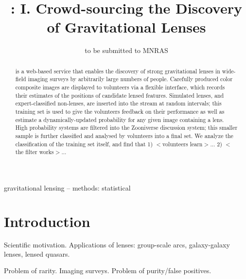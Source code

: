\documentclass[useAMS,usenatbib,a4paper]{mn2e}
\title[\sw I]
{\SW: I. Crowd-sourcing the Discovery of Gravitational Lenses}
\author[Marshall et al.]{%
  
}
\begin{document}
             
\date{to be submitted to MNRAS}
\pagerange{\pageref{firstpage}--\pageref{lastpage}}

\maketitle           

\label{firstpage}


\begin{abstract} 

\sw is a web-based service
 that enables the discovery of strong
gravitational lenses in wide-field imaging surveys by arbitrarily large
numbers of people. Carefully produced color composite images are
displayed to volunteers via a flexible interface, which records
their estimates of the positions of candidate lensed features. Simulated
lenses, and expert-classified non-lenses, are inserted into the stream
at random intervals; this training set is used to give the volunteers
feedback on their performance as well as estimate a dynamically-updated
probability for any given image containing a lens. High probability
systems are filtered into the Zooniverse \Talk discussion system; this
smaller sample is further classified and analysed by volunteers into a
final set. We analyze the classification of the training set itself, and
find that 1) $<$volunteers learn$>$... 2) $<$the filter works$>$... 

\end{abstract}


\begin{keywords}
  gravitational lensing   --
  methods: statistical    
\end{keywords}

\setcounter{footnote}{1}


\section{Introduction}
\label{sec:intro}

Scientific motivation. Applications of lenses: group-scale arcs,
galaxy-galaxy lenses, lensed quasars. 

Problem of rarity. Imaging surveys. Problem of purity/false positives.
\end{document}
